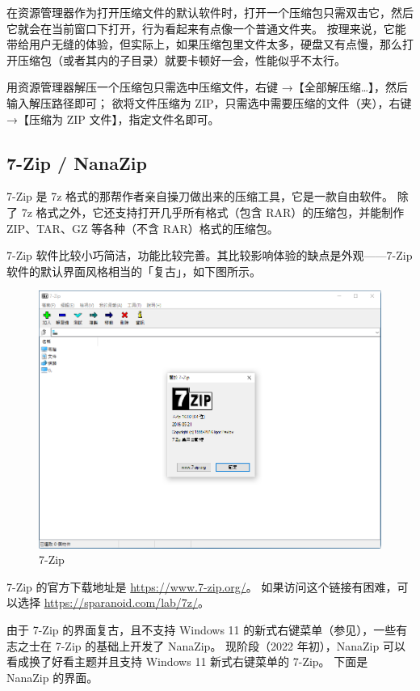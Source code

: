 在资源管理器作为打开压缩文件的默认软件时，打开一个压缩包只需双击它，然后它就会在当前窗口下打开，行为看起来有点像一个普通文件夹。
按理来说，它能带给用户无缝的体验，但实际上，如果压缩包里文件太多，硬盘又有点慢，那么打开压缩包（或者其内的子目录）就要卡顿好一会，性能似乎不太行。

用资源管理器解压一个压缩包只需选中压缩文件，右键 →【全部解压缩…】，然后输入解压路径即可；
欲将文件压缩为 ZIP，只需选中需要压缩的文件（夹），右键 →【压缩为 ZIP 文件】，指定文件名即可。

\subsection{7-Zip / NanaZip}

7-Zip 是 7z 格式的那帮作者亲自操刀做出来的压缩工具，它是一款自由软件。
除了 7z 格式之外，它还支持打开几乎所有格式（包含 RAR）的压缩包，并能制作 ZIP、TAR、GZ 等各种（不含 RAR）格式的压缩包。

7-Zip 软件比较小巧简洁，功能比较完善。其比较影响体验的缺点是外观——7-Zip 软件的默认界面风格相当的「复古」，如下图所示。

\begin{figure}[htb!]
  \centering
  \includegraphics[width=.8\textwidth]{assets/7-Zip.png}
  \caption{7-Zip}
  \label{7-Zip}
\end{figure}

7-Zip 的官方下载地址是 \url{https://www.7-zip.org/}。
如果访问这个链接有困难，可以选择 \url{https://sparanoid.com/lab/7z/}。

由于 7-Zip 的界面复古，且不支持 Windows 11 的新式右键菜单（参见），一些有志之士在 7-Zip 的基础上开发了 NanaZip。
现阶段（2022 年初），NanaZip 可以看成换了好看主题并且支持 Windows 11 新式右键菜单的 7-Zip。
下面是 NanaZip 的界面。


